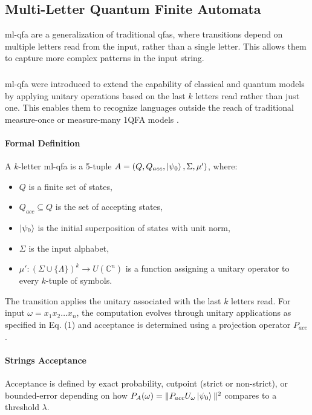 \subsection{Multi-Letter Quantum Finite Automata}
\label{sec:multi-letter-qfa}

\gls{ml-qfa} are a generalization of traditional \glspl{qfa}, where transitions depend on multiple letters read from the input, rather than a single letter. This allows them to capture more complex patterns in the input string.

\subsubsection{}

\gls{ml-qfa} were introduced to extend the capability of classical and quantum models by applying unitary operations based on the last $k$ letters read rather than just one. This enables them to recognize languages outside the reach of traditional measure-once or measure-many 1QFA models \cite{belovs2007multi}.

\paragraph{Formal Definition}
A $k$-letter \gls{ml-qfa} is a 5-tuple $A = (Q, Q_{acc}, \ket{\psi_0}, \Sigma, \mu')$, where:
\begin{itemize}
    \item $Q$ is a finite set of states,
    \item $Q_{acc} \subseteq Q$ is the set of accepting states,
    \item $\ket{\psi_0}$ is the initial superposition of states with unit norm,
    \item $\Sigma$ is the input alphabet,
    \item $\mu': (\Sigma \cup \{\Lambda\})^k \to U(\mathbb{C}^n)$ is a function assigning a unitary operator to every $k$-tuple of symbols.
\end{itemize}
The transition applies the unitary associated with the last $k$ letters read. For input $\omega = x_1 x_2 \dots x_n$, the computation evolves through unitary applications as specified in Eq. (1) and acceptance is determined using a projection operator $P_{acc}$ \cite{qiu2009hierarchy}.

\paragraph{Strings Acceptance}
Acceptance is defined by exact probability, cutpoint (strict or non-strict), or bounded-error depending on how $P_A(\omega) = \| P_{acc} U_\omega \ket{\psi_0} \|^2$ compares to a threshold $\lambda$.

